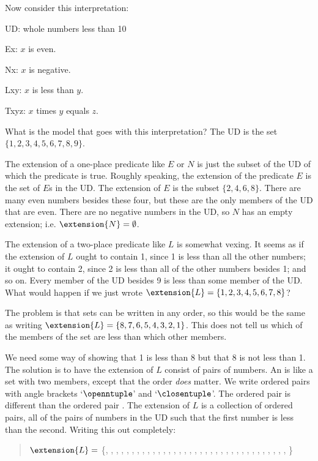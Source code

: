 Now consider this interpretation:
\begin{ekey}
\item{UD:} whole numbers less than 10
\item{Ex:} $x$ is even.
\item{Nx:} $x$ is negative.
\item{Lxy:} $x$ is less than $y$.
\item{Txyz:} $x$ times $y$ equals $z$.
\end{ekey}
What is the model that goes with this interpretation?
The UD is the set $\{1,2,3,4,5,6,7,8,9\}$.

The extension of a one-place predicate like $E$ or $N$ is just the subset of the UD of which the predicate is true. Roughly speaking, the extension of the predicate $E$ is the set of $E$s in the UD.
The extension of $E$ is the subset $\{2,4,6,8\}$. There are many even numbers besides these four, but these are the only members of the UD that are even. There are no negative numbers in the UD, so $N$ has an empty extension; i.e. $\extension{N}=\emptyset$.


The extension of a two-place predicate like $L$ is somewhat vexing. It seems as if the extension of $L$ ought to contain 1, since 1 is less than all the other numbers; it ought to contain 2, since 2 is less than all of the other numbers besides 1; and so on. Every member of the UD besides 9 is less than some member of the UD. What would happen if we just wrote $\extension{L}=\{1,2,3,4,5,6,7,8\}$?

The problem is that sets can be written in any order, so this would be the same as writing $\extension{L}=\{8,7,6,5,4,3,2,1\}$. This does not tell us which of the members of the set are less than which other members.

We need some way of showing that 1 is less than 8 but that 8 is not less than 1. The solution is to have the extension of $L$ consist of pairs of numbers. An  is like a set with two members, except that the order \emph{does} matter. We write ordered pairs with angle brackets `$\openntuple$' and `$\closentuple$'. The ordered pair \mbox{} is different than the ordered pair \mbox{}. The extension of $L$ is a collection of ordered pairs, all of the pairs of numbers in the UD such that the first number is less than the second. Writing this out completely:


\begin{quote}
$\extension{L}=$ \{, , , , , , , ,
, , , , , , ,
, , , , , ,
, , , , ,
, , , ,
, , ,
, ,
%
\}
\end{quote}


